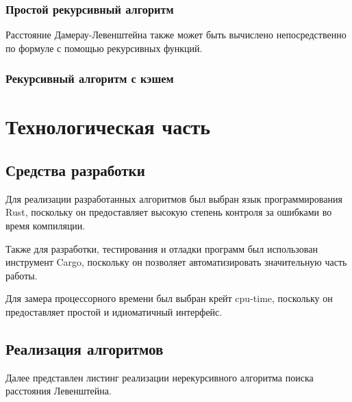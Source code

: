 \documentclass[oneside, a4paper, 12pt]{article}
\begin{document}
\subsubsection{Простой рекурсивный алгоритм}

Расстояние Дамерау-Левенштейна также может быть вычислено
непосредственно по формуле с помощью рекурсивных функций.

\subsubsection{Рекурсивный алгоритм с кэшем}

\section{Технологическая часть}

\subsection{Средства разработки}

Для реализации разработанных алгоритмов был выбран язык
программирования Rust, поскольку он предоставляет высокую степень
контроля за ошибками во время компиляции.

Также для разработки, тестирования и отладки программ был
использован инструмент Cargo, поскольку он позволяет
автоматизировать значительную часть работы.

Для замера процессорного времени был выбран крейт cpu-time,
поскольку он предоставляет простой и идиоматичный интерфейс.

\subsection{Реализация алгоритмов}

Далее представлен листинг реализации нерекурсивного алгоритма
поиска расстояния Левенштейна.
\end{document}
